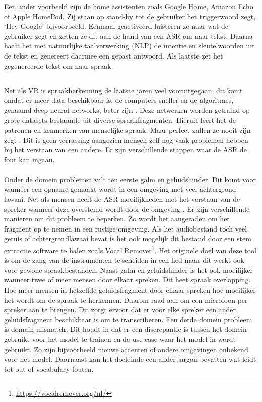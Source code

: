 Een ander voorbeeld zijn de home assistenten zoals Google Home, Amazon Echo of Apple HomePod. Zij staan op stand-by tot de gebruiker het triggerwoord zegt, `Hey Google' bijvoorbeeld. Eenmaal geactiveerd luisteren ze naar wat de gebruiker zegt en zetten ze dit aan de hand van een ASR om naar tekst. Daarna haalt het met natuurlijke taalverwerking (NLP) de intentie en sleutelwoorden uit de tekst en genereert daarmee een gepast antwoord. Als laatste zet het gegenereerde tekst om naar spraak.

\subsection{}%

Net als VR is spraakherkenning de laatste jaren veel vooruitgegaan, dit komt omdat er meer data beschikbaar is, de computers sneller en de algoritmes, genaamd deep neural networks, beter zijn \autocite{Hessen2020}. Deze netwerken worden getraind op grote datasets bestaande uit diverse spraakfragmenten. Hieruit leert het de patronen en kenmerken van menselijke spraak. Maar perfect zullen ze nooit zijn zegt \textcite{Hessen2020}. Dit is geen verrassing aangezien mensen zelf nog vaak problemen hebben bij het verstaan van een andere. Er zijn verschillende stappen waar de ASR de fout kan ingaan.

\paragraph{}%
Onder de domein problemen valt ten eerste galm en geluidshinder. Dit komt voor wanneer een opname gemaakt wordt in een omgeving met veel achtergrond lawaai. Net als mensen heeft de ASR moeilijkheden met het verstaan van de spreker wanneer deze overstemd wordt door de omgeving \autocite{Alharbi2021}. Er zijn verschillende manieren om dit probleem te beperken. Zo wordt het aangeraden om het fragment op te nemen in een rustige omgeving. Als het audiobestand toch veel geruis of achtergrondlawaai bevat is het ook mogelijk dit bestand door een stem extractie software te halen zoals Vocal Remover\footnote{\href{https://vocalremover.org/nl/}{https://vocalremover.org/nl/}}. Het originele doel van deze tool is om de zang van de instrumenten te scheiden in een lied maar dit werkt ook voor gewone spraakbestanden. Naast galm en geluidshinder is het ook moeilijker wanneer twee of meer mensen door elkaar spreken. Dit heet spraak overlapping. Hoe meer mensen in hetzelfde geluidsfragment door elkaar spreken hoe moeilijker het wordt om de spraak te herkennen. Daarom raad \textcite{Hessen2020} aan om een microfoon per spreker aan te brengen. Dit zorgt ervoor dat er voor elke spreker een ander geluidsfragment beschikbaar is om te transcriberen. Een derde domein probleem is domain mismatch. Dit houdt in dat er een discrepantie is tussen het domein gebruikt voor het model te trainen en de use case waar het model in wordt gebruikt. Zo zijn bijvoorbeeld nieuwe accenten of andere omgevingen onbekend voor het model. Daarnaast kan het doeleinde een ander jargon bevatten wat leidt tot out-of-vocabulary fouten.\autocite{Alharbi2021}

